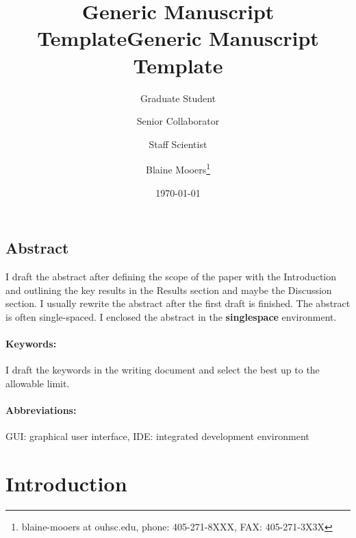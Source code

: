 \documentclass[11pt,letterpaper]{article}
\date{\today}
\title{Generic Manuscript Template}
\begin{document}
\author[1]{Graduate Student}
\author[2]{Senior Collaborator}
\author[3]{Staff Scientist}
\author[1,2,3]{Blaine Mooers\thanks{blaine-mooers at ouhsc.edu, phone: 405-271-8XXX, FAX: 405-271-3X3X}}


\title{Generic Manuscript Template}

\maketitle
{} %
\newpage
{}
\linenumbers


\begin{singlespace}
\section*{Abstract}
I draft the abstract after defining the scope of the paper with the Introduction and outlining the key results in the Results section and maybe the Discussion section.
I usually rewrite the abstract after the first draft is finished.
The abstract is often single-spaced.
I enclosed the abstract in the \textbf{\textbf{\textbf{singlespace}}} environment.
\end{singlespace}

\paragraph{ Keywords:} I draft the keywords in the writing document and select the best up to the allowable limit.

\paragraph{Abbreviations:} GUI: graphical user interface, IDE: integrated development environment



\section*{Introduction}
\label{sec:orgcb30f27}
\end{document}
